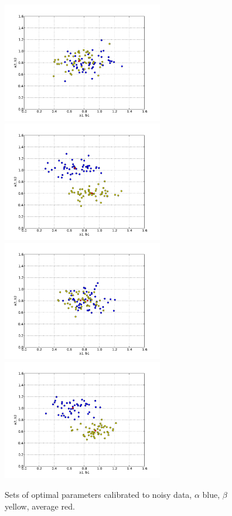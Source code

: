 \begin{figure}
\begin{center}
    \includegraphics[width=7cm]{chapters/schroll/pdf/4Dsample3-5.pdf}
    \includegraphics[width=7cm]{chapters/schroll/pdf/4Dsample3b-5.pdf}
    \includegraphics[width=7cm]{chapters/schroll/pdf/4Dsample4-5.pdf}
    \includegraphics[width=7cm]{chapters/schroll/pdf/4Dsample4b-5.pdf}
    \vspace{-0.7cm}
    \caption{Sets of optimal parameters calibrated to noisy data, $\alpha$ blue, $\beta$ yellow, average red.}
    \label{fig7}
  \end{center}
\end{figure}

